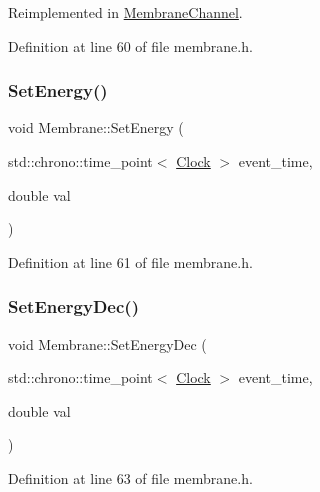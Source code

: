 Reimplemented in \hyperlink{class_membrane_channel_a61931feff8f3bb485eeb5c80125bb732}{Membrane\+Channel}.



Definition at line 60 of file membrane.\+h.

\mbox{\label{class_membrane_a37beeb28761af644bc3a51d3509f14f1}} 
\subsubsection{\texorpdfstring{Set\+Energy()}{SetEnergy()}}
{\footnotesize\ttfamily void Membrane\+::\+Set\+Energy (\begin{DoxyParamCaption}\item[{std\+::chrono\+::time\+\_\+point$<$ \hyperlink{universe_8h_a0ef8d951d1ca5ab3cfaf7ab4c7a6fd80}{Clock} $>$}]{event\+\_\+time,  }\item[{double}]{val }\end{DoxyParamCaption})\hspace{0.3cm}{\ttfamily [inline]}}



Definition at line 61 of file membrane.\+h.

\mbox{\label{class_membrane_acefb2fe781d7316b232614663777cde1}} 
\subsubsection{\texorpdfstring{Set\+Energy\+Dec()}{SetEnergyDec()}}
{\footnotesize\ttfamily void Membrane\+::\+Set\+Energy\+Dec (\begin{DoxyParamCaption}\item[{std\+::chrono\+::time\+\_\+point$<$ \hyperlink{universe_8h_a0ef8d951d1ca5ab3cfaf7ab4c7a6fd80}{Clock} $>$}]{event\+\_\+time,  }\item[{double}]{val }\end{DoxyParamCaption})\hspace{0.3cm}{\ttfamily [inline]}}



Definition at line 63 of file membrane.\+h.

\mbox{\label{class_membrane_abd1c69b9b0260799afd3965c34f881ff}} 
